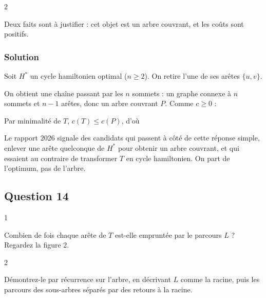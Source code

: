 \documentclass[11pt,a4paper]{article}
\newcommand{\equationajustee}[1]{%
  \sbox{\boiteequation}{$\displaystyle #1$}%
  \ifdim\wd\boiteequation>\linewidth
    \[\resizebox{\linewidth}{!}{\usebox{\boiteequation}}\]%
  \else
    \[#1\]%
  \fi}
\begin{document}
\begin{indication}{2}

Deux faits sont à justifier : cet objet est un arbre couvrant, et les coûts sont positifs.

\end{indication}

\hypertarget{solution-12}{%
\subsubsection{Solution}\label{solution-12}}

Soit \(H^\ast\) un cycle hamiltonien optimal (\(n\ge 2\)). On retire l'une de ses arêtes \(\{u,v\}\).

On obtient une chaîne passant par les \(n\) sommets : un graphe connexe à \(n\) sommets et \(n-1\) arêtes, donc un arbre couvrant \(P\). Comme \(c\ge 0\) :

\equationajustee{c(P)=c(H^\ast)-c(u,v)\le c(H^\ast).}

Par minimalité de \(T\), \(c(T)\le c(P)\), d'où

\equationajustee{c(T)\le c(H^\ast).}

\begin{piege}

Le rapport 2026 signale des candidats qui passent à côté de cette réponse simple, enlever une arête quelconque de \(H^\ast\) pour obtenir un arbre couvrant, et qui essaient au contraire de transformer \(T\) en cycle hamiltonien. On part de l'optimum, pas de l'arbre.

\end{piege}

\hypertarget{question-14}{%
\subsection{Question 14}\label{question-14}}

\begin{indication}{1}

Combien de fois chaque arête de \(T\) est-elle empruntée par le parcours \(L\) ? Regardez la figure 2.

\end{indication}

\begin{indication}{2}

Démontrez-le par récurrence sur l'arbre, en décrivant \(L\) comme la racine, puis les parcours des sous-arbres séparés par des retours à la racine.

\end{indication}
\end{document}
